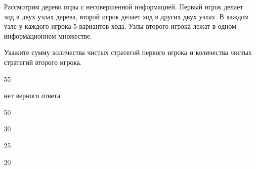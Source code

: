 
\begin{question}
Рассмотрим дерево игры с несовершенной информацией.
Первый игрок делает ход в двух узлах дерева, второй игрок делает ход в других двух узлах.
В каждом узле у каждого игрока 5 вариантов хода.
Узлы второго игрока лежат в одном информационном множестве.

Укажите сумму количества чистых стратегий первого игрока и количества чистых стратегий второго игрока.
\begin{answerlist}
  \item 55
  \item нет верного ответа
  \item 50
  \item 30
  \item 25
  \item 20
\end{answerlist}
\end{question}


